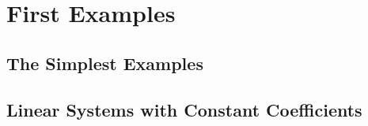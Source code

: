 \chapter{First Examples}

\section{The Simplest Examples}

\section{Linear Systems with Constant Coefficients}
